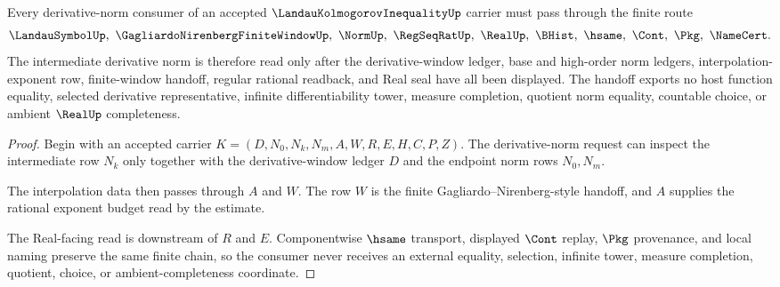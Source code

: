 \begin{theorem}
\label{thm:landau-kolmogorov-inequality-derivative-norm-handoff}
Every derivative-norm consumer of an accepted $\LandauKolmogorovInequalityUp$ carrier must pass through the finite route
$$
\LandauSymbolUp,\ \GagliardoNirenbergFiniteWindowUp,\ \NormUp,\ \RegSeqRatUp,\ \RealUp,\ \BHist,\ \hsame,\ \Cont,\ \Pkg,\ \NameCert .
$$
The intermediate derivative norm is therefore read only after the derivative-window ledger, base and high-order norm ledgers, interpolation-exponent row, finite-window handoff, regular rational readback, and Real seal have all been displayed. The handoff exports no host function equality, selected derivative representative, infinite differentiability tower, measure completion, quotient norm equality, countable choice, or ambient $\RealUp$ completeness.
\end{theorem}
\begin{proof}
Begin with an accepted carrier $K=(D,N_0,N_k,N_m,A,W,R,E,H,C,P,Z)$. The derivative-norm request can inspect the intermediate row $N_k$ only together with the derivative-window ledger $D$ and the endpoint norm rows $N_0,N_m$.

The interpolation data then passes through $A$ and $W$. The row $W$ is the finite Gagliardo--Nirenberg-style handoff, and $A$ supplies the rational exponent budget read by the estimate.

The Real-facing read is downstream of $R$ and $E$. Componentwise $\hsame$ transport, displayed $\Cont$ replay, $\Pkg$ provenance, and local naming preserve the same finite chain, so the consumer never receives an external equality, selection, infinite tower, measure completion, quotient, choice, or ambient-completeness coordinate.
\end{proof}


